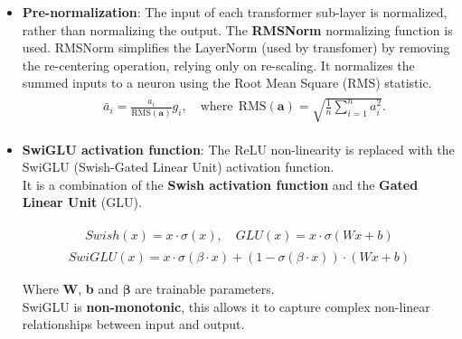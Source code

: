 \documentclass{article}
\begin{document}
		\begin{itemize}
		
			\item 
				\textbf{Pre-normalization}: The input of each transformer sub-layer is normalized, rather than normalizing the output. The \textbf{RMSNorm} normalizing function is used. RMSNorm simplifies the LayerNorm (used by transfomer) by removing the re-centering operation, relying only on re-scaling. It normalizes the summed inputs to a neuron using the Root Mean Square (RMS) statistic.
				\begin{align}\label{eq_rmsnorm}
					\begin{split}
						& \bar{a}_i = \frac{a_i}{\text{RMS}(\mathbf{a})} g_i, \quad \text{where}~~ \text{RMS}(\mathbf{a}) = \sqrt{\frac{1}{n} \sum_{i=1}^{n} a_i^2}.
					\end{split}
				\end{align}
			
			\item
				\textbf{SwiGLU activation function}: The ReLU non-linearity is replaced with the SwiGLU (Swish-Gated Linear Unit) activation function. \\
				It is a combination of the \textbf{Swish activation function} and the \textbf{Gated Linear Unit} (GLU).
				
				\begin{align}\label{eq_swish_func}
					\begin{split}
						Swish(x) = x \cdot \sigma(x),  \quad GLU(x) = x \cdot \sigma(Wx + b)
					\end{split}
				\end{align}
				\begin{align}
					SwiGLU(x) = x \cdot \sigma(\beta \cdot x) + (1 - \sigma(\beta \cdot x)) \cdot (Wx + b)
				\end{align}
				
				Where \textbf{W}, \textbf{b} and $\boldsymbol{\beta}$  are trainable parameters. \\
				SwiGLU is \textbf{non-monotonic}, this allows it to capture complex non-linear relationships between input and output.
			

\end{itemize}
\end{document}
